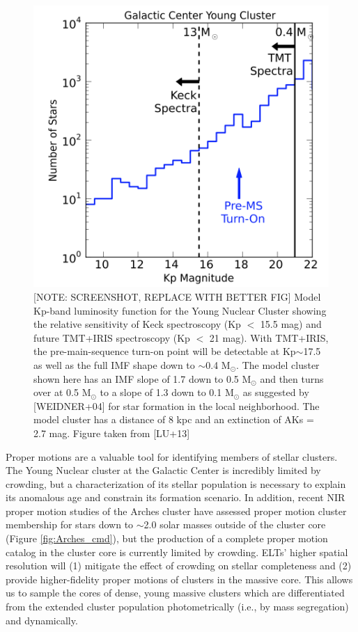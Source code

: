 \documentclass[11pt]{article}
\begin{document}
\begin{figure}
    \centering
    \includegraphics[scale=0.4]{TMT_YNC.png}
    \caption{[NOTE: SCREENSHOT, REPLACE WITH BETTER FIG] Model Kp-band luminosity function for the Young Nuclear Cluster showing the relative sensitivity of Keck spectroscopy (Kp $<$ 15.5 mag) and future TMT+IRIS spectroscopy (Kp $<$ 21 mag). With TMT+IRIS, the pre-main-sequence turn-on point will be detectable at Kp$\sim$17.5 as well as the full IMF shape down to $\sim$0.4 M$_{\odot}$. The model cluster shown here has an IMF slope of 1.7 down to 0.5 M$_{\odot}$ and then turns over at 0.5 M$_{\odot}$ to a slope of 1.3 down to 0.1 M$_{\odot}$ as suggested by [WEIDNER+04] for star formation in the local neighborhood. The model cluster has a distance of 8 kpc and an extinction of AKs = 2.7 mag.
    Figure taken from [LU+13]}
    \label{fig:TMT_YNC}
\end{figure}


Proper motions are a valuable tool for identifying members of stellar clusters. The Young Nuclear cluster at the Galactic Center is incredibly limited by crowding, but a characterization of its stellar population is necessary to explain its anomalous age and constrain its formation scenario. In addition, recent NIR proper motion studies of the Arches cluster have assessed proper motion cluster membership for stars down to $\sim$2.0 solar masses outside of the cluster core (Figure \ref{fig:Arches_cmd}), but the production of a complete proper motion catalog in the cluster core is currently limited by crowding. ELTs’ higher spatial resolution will (1) mitigate the effect of crowding on stellar completeness and (2) provide higher-fidelity proper motions of clusters in the massive core. This allows us to sample the cores of dense, young massive clusters which are differentiated from the extended cluster population photometrically (i.e., by mass segregation) and dynamically.
\end{document}
